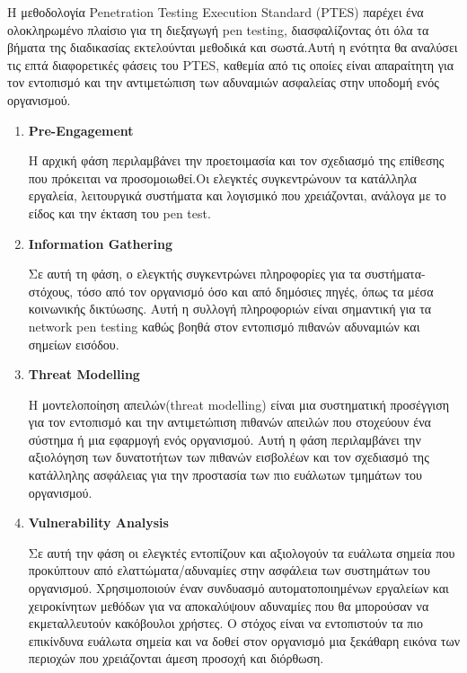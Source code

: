 Η μεθοδολογία \lt Penetration Testing Execution Standard (PTES) \gt παρέχει ένα ολοκληρωμένο πλαίσιο για τη διεξαγωγή \lt pen testing\gt, διασφαλίζοντας ότι όλα τα βήματα της διαδικασίας εκτελούνται μεθοδικά και σωστά.Αυτή η ενότητα θα αναλύσει τις επτά διαφορετικές φάσεις του \lt PTES, \gt καθεμία από τις οποίες είναι απαραίτητη για τον εντοπισμό και την αντιμετώπιση των αδυναμιών ασφαλείας στην υποδομή ενός οργανισμού.

\begin{enumerate}
    \item \textbf{\lt  Pre-Engagement}

    
   Η αρχική φάση περιλαμβάνει την προετοιμασία και τον σχεδιασμό της επίθεσης που πρόκειται να προσομοιωθεί.Οι ελεγκτές συγκεντρώνουν τα κατάλληλα εργαλεία, λειτουργικά συστήματα και λογισμικό που χρειάζονται, ανάλογα με το είδος και την έκταση του \lt pen test\gt. 

    \item \textbf{\lt  Information Gathering}

Σε αυτή τη φάση, ο ελεγκτής συγκεντρώνει πληροφορίες για τα συστήματα-στόχους, τόσο από τον οργανισμό όσο και από δημόσιες πηγές, όπως τα μέσα κοινωνικής δικτύωσης. Αυτή η συλλογή πληροφοριών είναι σημαντική για τα \lt network pen testing \gt καθώς βοηθά στον εντοπισμό πιθανών αδυναμιών και σημείων εισόδου.

\item \textbf{\lt  Threat Modelling}

Η μοντελοποίηση απειλών(\lt threat modelling\gt) είναι μια συστηματική προσέγγιση για τον εντοπισμό και την αντιμετώπιση πιθανών απειλών που στοχεύουν ένα σύστημα ή μια εφαρμογή ενός οργανισμού. Αυτή η φάση περιλαμβάνει την αξιολόγηση των δυνατοτήτων των πιθανών εισβολέων και τον σχεδιασμό της κατάλληλης ασφάλειας για την προστασία των πιο ευάλωτων τμημάτων του οργανισμού.


\item \textbf{\lt  Vulnerability Analysis}

Σε αυτή την φάση  οι ελεγκτές εντοπίζουν και αξιολογούν τα ευάλωτα σημεία που προκύπτουν από ελαττώματα/αδυναμίες στην ασφάλεια των συστημάτων  του οργανισμού. Χρησιμοποιούν έναν συνδυασμό αυτοματοποιημένων εργαλείων και χειροκίνητων μεθόδων για να αποκαλύψουν αδυναμίες που θα μπορούσαν να εκμεταλλευτούν κακόβουλοι χρήστες. Ο στόχος είναι να εντοπιστούν τα πιο επικίνδυνα ευάλωτα σημεία και να δοθεί στον οργανισμό μια ξεκάθαρη εικόνα των περιοχών που χρειάζονται άμεση προσοχή και διόρθωση.


\end{enumerate}
